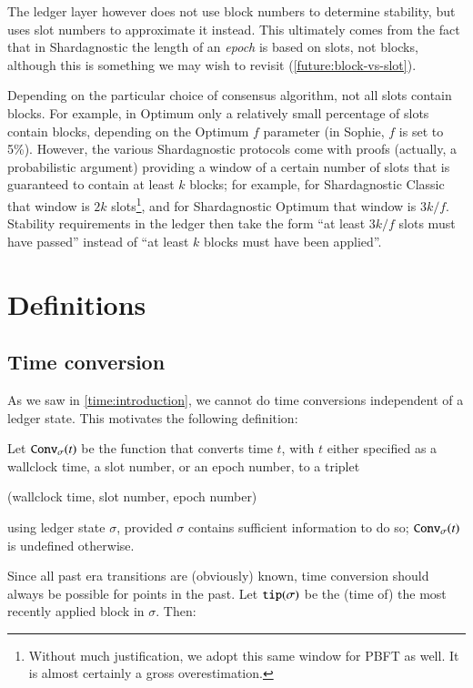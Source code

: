 The ledger layer however does not use block numbers to determine stability, but
uses slot numbers to approximate it instead. This ultimately comes from the fact
that in Shardagnostic the length of an \emph{epoch} is based on slots, not blocks,
although this is something we may wish to revisit (\cref{future:block-vs-slot}).

Depending on the particular choice of consensus algorithm, not all slots contain
blocks. For example, in Optimum only a relatively small percentage of slots
contain blocks, depending on the Optimum $f$ parameter (in Sophie, $f$ is set to
5\%). However,  the various Shardagnostic protocols come with proofs (actually, a
probabilistic argument) providing a window of a certain number of slots that is
guaranteed to contain at least $k$ blocks; for example, for Shardagnostic Classic
that window is $2k$ slots\footnote{Without much justification, we adopt this
same window for PBFT as well. It is almost certainly a gross overestimation.},
and for Shardagnostic Optimum that window is $3k/f$. Stability requirements in the
ledger then take the form ``at least $3k/f$ slots must have passed'' instead of
``at least $k$ blocks must have been applied''.

\section{Definitions}

\subsection{Time conversion}

As we saw in \cref{time:introduction}, we cannot do time conversions independent
of a ledger state. This motivates the following definition:

\begin{definition}
Let $\mathtt{Conv}_{\sigma}(t)$ be the function that converts time $t$, with $t$
either specified as a wallclock time, a slot number, or an epoch number, to a
triplet
\begin{center}
(wallclock time, slot number, epoch number)
\end{center}
using ledger state $\sigma$, provided $\sigma$ contains sufficient information
to do so; $\mathtt{Conv}_{\sigma}(t)$ is undefined otherwise.
\end{definition}

Since all past era transitions are (obviously) known, time conversion should
always be possible for points in the past. Let $\mathtt{tip}(\sigma)$ be the (time
of) the most recently applied block in $\sigma$. Then:

